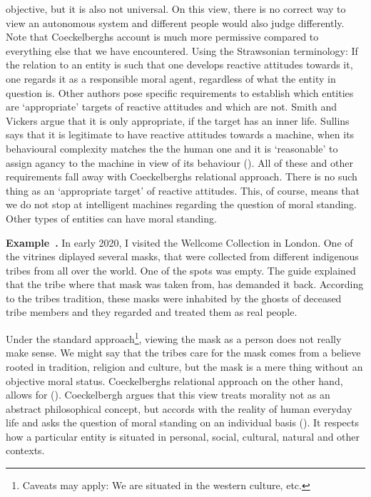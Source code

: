 \documentclass{article}
\newcounter{example}
\newenvironment{example}[1][]{\refstepcounter{example}\par\medskip
   \noindent \textbf{Example~\theexample. #1} \rmfamily}{\medskip}
\begin{document}
objective, but it is also not universal. On this view, there is no correct way
to view an autonomous system and different people would also judge differently.\\
Note that Coeckelberghs account is much more permissive compared to everything
else that we have encountered. Using the Strawsonian terminology: If the
relation to an entity is such that one develops reactive attitudes towards it,
one regards it as a responsible moral agent, regardless of what the entity in
question is. Other authors pose specific requirements to establish which
entities are `appropriate' targets of reactive attitudes and which are not.
Smith and Vickers argue that it is only appropriate, if the target has an inner
life. Sullins says that it is legitimate to have reactive attitudes towards a
machine, when its behavioural complexity matches the the human one and it is
`reasonable' to assign agancy to the machine in view of its behaviour
(\cite[p. 169]{sullins2006robot}). All of these and other requirements fall away
with Coeckelberghs relational approach. There is no such thing as an
`appropriate target' of reactive attitudes. This, of course, means that we do not
stop at intelligent machines regarding the question of moral standing. Other
types of entities can have moral standing.

\begin{example}
	In early 2020, I visited the Wellcome Collection in London. One of
	the vitrines diplayed several masks, that were collected from different
	indigenous tribes from all over the world. One of the spots was empty.
	The guide explained that the tribe where that mask was taken from, has
	demanded it back. According to the tribes tradition, these masks were
	inhabited by the ghosts of deceased tribe members and they regarded and
	treated them as real people.
\end{example}

Under the standard approach\footnote{Caveats may apply: We are situated in the
western culture, etc.}, viewing the mask as a person does not really make
sense. We might say that the tribes care for the mask comes from a believe
rooted in tradition, religion and culture, but the mask is a mere thing without
an objective moral status. Coeckelberghs relational approach on the other hand,
allows for  (\cite[p.
66]{coeckelbergh2014moral}). Coeckelbergh argues that this view treats morality
not as an abstract philosophical concept, but accords with the reality of human
everyday life and asks the question of moral standing on an individual basis (\cite[p.
66]{coeckelbergh2014moral}). It respects how a particular entity is situated in
personal, social, cultural, natural and other contexts.\\
\end{document}
